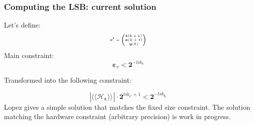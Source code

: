 \begin{frame}
	\frametitle{Computing the LSB: current solution}
	Let's define:%
			\begin{equation}
				\tiny
				\boldsymbol{v'}=
				\begin{pmatrix}
					\boldsymbol{t}(k+1) \\
					\boldsymbol{x}(k+1) \\
					\boldsymbol{y}(k)   \\
				\end{pmatrix}
			\end{equation}
	Main constraint:
		\begin{equation} \label{constraint}
			\boldsymbol{\varepsilon}_{v} < \boldsymbol{2}^{-lsb_{v}}
		\end{equation}

	Transformed into the following constraint:

		\begin{equation} \label{constraint}
			| \langle\langle \mathcal{H}_{\boldsymbol{\varepsilon}} \rangle\rangle_{} | \cdot \boldsymbol{2}^{lsb_{v'}+1} < \boldsymbol{2}^{-lsb_{y_i}}
		\end{equation}
	Lopez gives a simple solution that matches the fixed size constraint.
	The solution matching the hardware constraint (arbitrary precision) is work in progress.

\end{frame}

